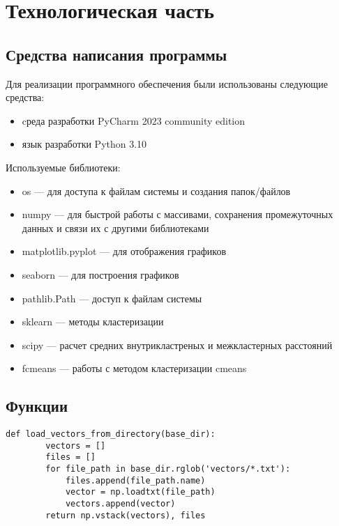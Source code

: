 \chapter{Технологическая часть}

\section{Средства написания программы}
Для реализации программного обеспечения были использованы следующие средства:

\begin{itemize}
    \item cреда разработки PyCharm 2023 community edition \cite{lib:pycharm}
    \item язык разработки Python 3.10 \cite{lib:python}
\end{itemize}
	
Используемые библиотеки:
\begin{itemize}
    \item os — для доступа к файлам системы и создания папок/файлов \cite{lib:os}
    \item numpy — для быстрой работы с массивами, сохранения промежуточных данных и связи их с другими библиотеками \cite{lib:numpy}
    \item matplotlib.pyplot — для отображения графиков \cite{lib:matplotlib}
    \item seaborn — для построения графиков \cite{lib:seaborn}
    \item pathlib.Path — доступ к файлам системы \cite{lib:pathlib}
    \item sklearn — методы кластеризации \cite{lib:sklearn}
    \item scipy — расчет средних внутрикластреных и межкластерных расстояний \cite{lib:scipy}
    \item fcmeans — работы с методом кластеризации cmeans \cite{lib:fcmeans}
\end{itemize}

\section{Функции}

\begin{lstlisting}[caption={Загрузка векторов документов}]
    def load_vectors_from_directory(base_dir):
        vectors = []
        files = []
        for file_path in base_dir.rglob('vectors/*.txt'):
            files.append(file_path.name)
            vector = np.loadtxt(file_path)
            vectors.append(vector)
        return np.vstack(vectors), files
\end{lstlisting}

